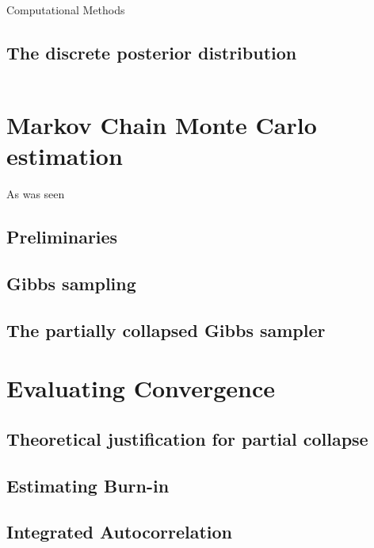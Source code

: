 \begin{chapter}{Computational Methods}
  \subsection{The discrete posterior distribution}
  \begin{equation} \label{eq:posterior}

  \end{equation}
\section{Markov Chain Monte Carlo estimation} \label{sec:pcgibbs}
  As was seen 
  \subsection{Preliminaries}
  \subsection{Gibbs sampling}
  \subsection{The partially collapsed Gibbs sampler}
\section{Evaluating Convergence}
  \subsection{Theoretical justification for partial collapse}
  \subsection{Estimating Burn-in}
  \subsection{Integrated Autocorrelation}
\end{chapter}
